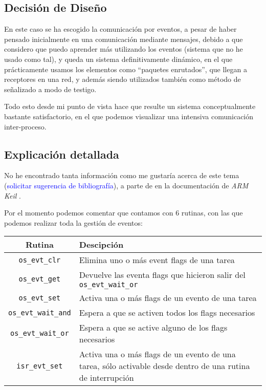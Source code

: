 \documentclass[a4paper,openright,12pt]{article}
\begin{document}
\subsection{Decisión de Diseño}
En este caso se ha escogido la comunicación por eventos, a pesar de haber pensado inicialmente en una comunicación mediante mensajes, debido a que considero
que puedo aprender más utilizando los eventos (sistema que no he usado como tal), y queda un sistema definitivamente dinámico, en el que prácticamente usamos los elementos como
``paquetes enrutados'', que llegan a receptores en una red, y además siendo utilizados también como método de señalizado a modo de testigo.

Todo esto desde mi punto de vista hace que resulte un sistema conceptualmente bastante satisfactorio, en el que podemos visualizar una intensiva comunicación inter-proceso.

\subsection{Explicación detallada}
No he encontrado tanta información como me gustaría acerca de este tema (\textcolor{blue}{solicitar sugerencia de bibliografía}), a parte de en la documentación de \emph{ARM
Keil} \autocite[]{keil_function_reference}.

Por el momento podemos comentar que contamos con 6 rutinas, con las que podemos realizar toda la gestión de eventos:
\begin{samepage}
\begin{center}
\begin{tabular}{ | c | >{\centering\arraybackslash}m{11cm} | }
    \hline
    Rutina              &   Descipción\\
    \hline
    \texttt{os\_evt\_clr}        &   Elimina uno o más event flags de una tarea\\
    \hline
    \texttt{os\_evt\_get}        &   Devuelve las eventa flags que hicieron salir del \texttt{os\_evt\_wait\_or}\\
    \hline
    \texttt{os\_evt\_set}        &   Activa una o más flags de un evento de una tarea\\
    \hline
    \texttt{os\_evt\_wait\_and}  &   Espera a que se activen todos los flags necesarios\\
    \hline
    \texttt{os\_evt\_wait\_or}   &   Espera a que se active alguno de los flags necesarios\\
    \hline
    \texttt{isr\_evt\_set}       &   Activa una o más flags de un evento de una tarea, sólo activable desde dentro de una rutina de interrupción\\
    \hline
\end{tabular}
\end{center}
\end{samepage}
\end{document}
